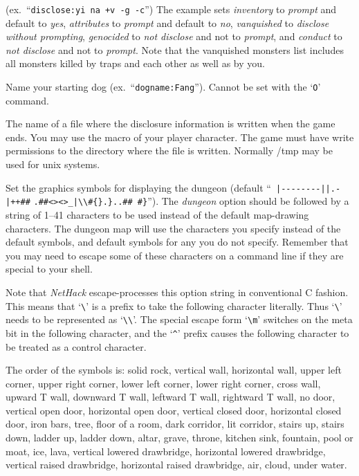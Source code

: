 (ex.\ ``{\tt disclose:yi na +v -g -c}'')
The example sets {\it inventory\/} to {\it prompt\/} and default to {\it yes\/}, 
{\it attributes\/} to {\it prompt\/} and default to {\it no\/}, 
{\it vanquished\/} to {\it disclose without prompting\/}, 
{\it genocided\/} to {\it not disclose\/} and not to {\it prompt\/}, and 
{\it conduct\/} to {\it not disclose\/} and not to {\it prompt\/}.
Note that the vanquished monsters list includes all monsters killed by
traps and each other as well as by you. 
\item[\ib{dogname}]
Name your starting dog (ex.\ ``{\tt dogname:Fang}'').
Cannot be set with the `{\tt O}' command.
\item[\ib{dumpfile}]
The name of a file where the disclosure information is written when the
game ends. You may use the macro %
of your player character. The game must have write permissions to the
directory where the file is written. Normally /tmp may be used for unix
systems.
\item[\ib{dungeon}]
Set the graphics symbols for displaying the dungeon (default
``\verb& |--------||.-|++##& \verb&.##<><>_|\\#{}.}..## #}&'').
The {\it dungeon\/} option should be
followed by a string of 1--41
characters to be used instead of the default map-drawing characters.
The dungeon map will use the characters you specify instead of the
default symbols, and default symbols for any you do not specify.
Remember that you may need to escape some of these characters
on a command line if they are special to your shell.

Note that {\it NetHack\/} escape-processes this option string in conventional C
fashion.  This means that `\verb+\+' is a prefix to take the following
character literally.  Thus `\verb+\+' needs to be represented as `\verb+\\+'.
The special escape form
`\verb+\m+' switches on the meta bit in the following character, and the
`{\tt \^{}}' prefix causes the following character to be treated as a control
character.

The order of the symbols is:  solid rock, vertical wall, horizontal
wall, upper left corner, upper right corner, lower left corner, lower
right corner, cross wall, upward T wall, downward T wall, leftward T
wall, rightward T wall, no door, vertical open door, horizontal open
door, vertical closed door, horizontal closed door, iron bars, tree,
floor of a room, dark corridor, lit corridor, stairs up, stairs down,
ladder up, ladder down, altar, grave, throne, kitchen sink, fountain, pool or moat,
ice, lava, vertical lowered drawbridge, horizontal lowered drawbridge,
vertical raised drawbridge, horizontal raised drawbridge, air, cloud,
under water.

